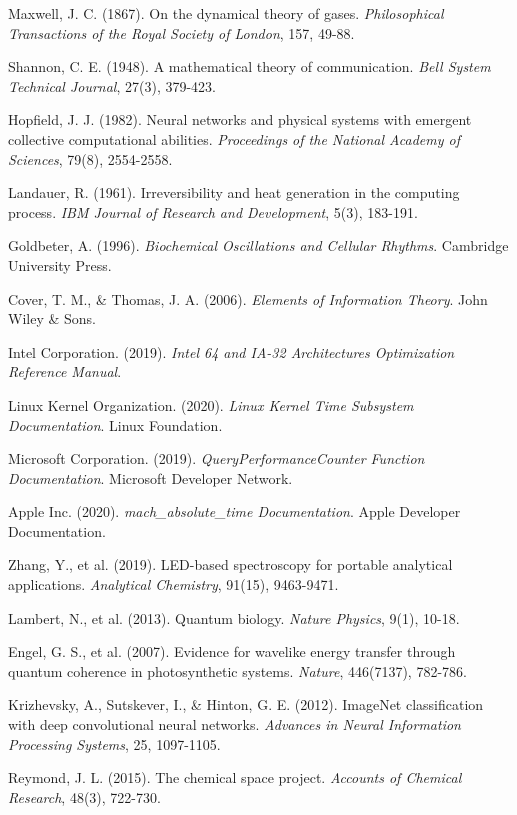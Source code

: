 \documentclass[12pt,a4paper]{article}
\begin{document}

\begin{thebibliography}{99}

Maxwell, J. C. (1867). On the dynamical theory of gases. \textit{Philosophical Transactions of the Royal Society of London}, 157, 49-88.

Shannon, C. E. (1948). A mathematical theory of communication. \textit{Bell System Technical Journal}, 27(3), 379-423.

Hopfield, J. J. (1982). Neural networks and physical systems with emergent collective computational abilities. \textit{Proceedings of the National Academy of Sciences}, 79(8), 2554-2558.

Landauer, R. (1961). Irreversibility and heat generation in the computing process. \textit{IBM Journal of Research and Development}, 5(3), 183-191.

Goldbeter, A. (1996). \textit{Biochemical Oscillations and Cellular Rhythms}. Cambridge University Press.

Cover, T. M., \& Thomas, J. A. (2006). \textit{Elements of Information Theory}. John Wiley \& Sons.

Intel Corporation. (2019). \textit{Intel 64 and IA-32 Architectures Optimization Reference Manual}.

Linux Kernel Organization. (2020). \textit{Linux Kernel Time Subsystem Documentation}. Linux Foundation.

Microsoft Corporation. (2019). \textit{QueryPerformanceCounter Function Documentation}. Microsoft Developer Network.

Apple Inc. (2020). \textit{mach\_absolute\_time Documentation}. Apple Developer Documentation.

Zhang, Y., et al. (2019). LED-based spectroscopy for portable analytical applications. \textit{Analytical Chemistry}, 91(15), 9463-9471.

Lambert, N., et al. (2013). Quantum biology. \textit{Nature Physics}, 9(1), 10-18.

Engel, G. S., et al. (2007). Evidence for wavelike energy transfer through quantum coherence in photosynthetic systems. \textit{Nature}, 446(7137), 782-786.

Krizhevsky, A., Sutskever, I., \& Hinton, G. E. (2012). ImageNet classification with deep convolutional neural networks. \textit{Advances in Neural Information Processing Systems}, 25, 1097-1105.

Reymond, J. L. (2015). The chemical space project. \textit{Accounts of Chemical Research}, 48(3), 722-730.

\end{thebibliography}
\end{document}
